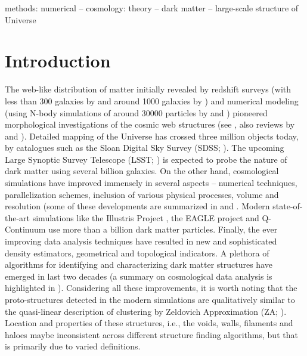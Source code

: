 \documentclass[fleqn,usenatbib,useAMS]{mnras}
\begin{document}
\begin{keywords}
methods: numerical -- cosmology: theory -- dark matter -- large-scale structure of Universe 
\end{keywords}

\begingroup
\let\clearpage\relax
\endgroup
\newpage

\section{Introduction} 
\label{sec:intro}

The web-like distribution of matter initially revealed by redshift surveys (with less than 300 galaxies by \citealt{Gregory1978} and around 1000 galaxies by \citealt{DeLapparent1986}) and numerical modeling (using N-body simulations of around 30000 particles by \citealt{Shandarin1983} and \citealt{Klypin1983a}) pioneered morphological investigations of the cosmic web structures (see \citealt{Bond1996}, also reviews by \citealt{Shandarin1989} and \citealt{Weygaert2008}). Detailed mapping of the Universe has crossed three million objects today, by catalogues such as the Sloan Digital Sky Survey (SDSS; \citealt{Albareti2016}). The upcoming Large Synoptic Survey Telescope (LSST; \citealt{lsst2009}) is expected to probe the nature of dark matter using several billion galaxies. On the other hand, cosmological simulations have improved immensely in several aspects -- numerical techniques, parallelization schemes, inclusion of various physical processes, volume and resolution (some of these developments are summarized in \cite{Bertschinger1998} and \cite{Bagla1997}. Modern state-of-the-art simulations like the Illustris Project \cite{Vogelsberger2014}, the EAGLE project \cite{Schaye2015} and Q-Continuum \cite{Heitmann2015} use more than a billion dark matter particles. Finally, the ever improving data analysis techniques have resulted in new and sophisticated density estimators, geometrical and topological indicators. A plethora of algorithms for identifying and characterizing dark matter structures have emerged in last two decades (a summary on cosmological data analysis is highlighted in \citealt{Weygaert2009a}). Considering all these improvements, it is worth noting that the proto-structures detected in the modern simulations are qualitatively similar to the quasi-linear description of clustering by Zeldovich Approximation (ZA; \citealt{Zeldovich1970}). Location and properties of these structures, i.e., the voids, walls, filaments and haloes maybe inconsistent across different structure finding algorithms, but that is primarily due to varied definitions. 
\end{document}
